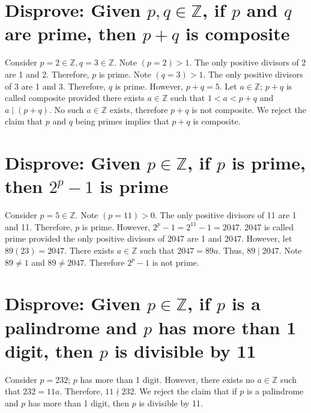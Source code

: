 \documentclass[12pt]{article}
\begin{document}
\section{Disprove: Given $p,q\in\mathbb{Z}$, if $p$ and $q$ are prime, then $p+q$ is composite}
Consider $p=2\in\mathbb{Z},q=3\in\mathbb{Z}$. Note $(p=2)>1$. The only positive divisors of 2 are 1 and 2. Therefore, $p$ is prime. Note $(q=3)>1$. The only positive divisors of 3 are 1 and 3. Therefore, $q$ is prime. However, $p+q=5$. Let $a\in\mathbb{Z}$; $p+q$ is called composite provided there exists $a\in\mathbb{Z}$ such that $1<a<p+q$ and $a \mid (p+q)$. No such $a\in\mathbb{Z}$ exists, therefore $p+q$ is not composite. We reject the claim that $p$ and $q$ being primes implies that $p+q$ is composite.
\section{Disprove: Given $p\in\mathbb{Z}$, if $p$ is prime, then $2^p-1$ is prime}
Consider $p=5\in\mathbb{Z}$. Note $(p=11)>0$. The only positive divisors of 11 are 1 and 11. Therefore, $p$ is prime. However, $2^p-1=2^{11}-1=2047$. 2047 is called prime provided the only positive divisors of 2047 are 1 and 2047. However, let $89(23)=2047$. There exists $a\in\mathbb{Z}$ such that $2047=89a$. Thus, $89 \mid 2047$. Note $89\neq 1$ and $89\neq 2047$. Therefore $2^p-1$ is not prime.
\section{Disprove: Given $p\in\mathbb{Z}$, if $p$ is a palindrome and $p$ has more than 1 digit, then $p$ is divisible by 11}
Consider $p=232$; $p$ has more than 1 digit. However, there exists no $a\in\mathbb{Z}$ such that $232=11a$. Therefore, $11 \nmid 232$. We reject the claim that if $p$ is a palindrome and $p$ has more than 1 digit, then $p$ is divisible by 11.
\end{document}
